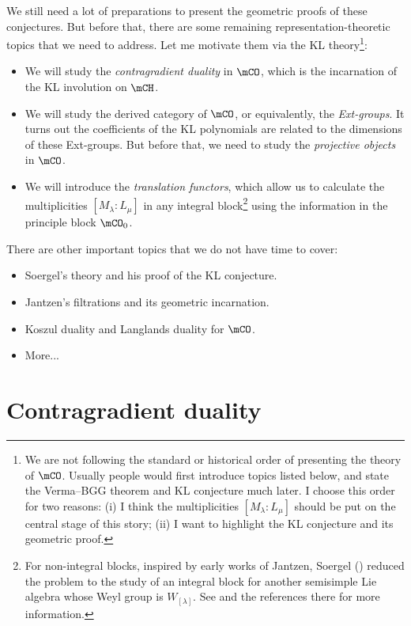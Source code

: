 	We still need a lot of preparations to present the geometric proofs of these conjectures. But before that, there are some remaining representation-theoretic topics that we need to address. Let me motivate them via the KL theory\footnote{We are not following the standard or historical order of presenting the theory of $\mCO$. Usually people would first introduce topics listed below, and state the Verma--BGG theorem and KL conjecture much later. I choose this order for two reasons: (i) I think the multiplicities $[M_\lambda:L_\mu]$ should be put on the central stage of this story; (ii) I want to highlight the KL conjecture and its geometric proof.}:
	\begin{itemize}
		\item 
			We will study the \emph{contragradient duality} in $\mCO$, which is the incarnation of the KL involution on $\mCH$.
		\item
			We will study the derived category of $\mCO$, or equivalently, the \emph{Ext-groups}. It turns out the coefficients of the KL polynomials are related to the dimensions of these Ext-groups. But before that, we need to study the \emph{projective objects} in $\mCO$.
		\item
			We will introduce the \emph{translation functors}, which allow us to calculate the multiplicities $[M_\lambda:L_\mu]$ in any integral block\footnote{For non-integral blocks, inspired by early works of Jantzen, Soergel (\!\!\cite{S}) reduced the problem to the study of an integral block for another semisimple Lie algebra whose Weyl group is $W_{[\lambda]}$. See \cite[Sect. 13.13]{H} and the references there for more information.} using the information in the principle block $\mCO_0$.
	\end{itemize}
	There are other important topics that we do not have time to cover:
	\begin{itemize}
		\item 
			Soergel's theory and his proof of the KL conjecture.
		\item
			Jantzen's filtrations and its geometric incarnation.
		\item
			Koszul duality and Langlands duality for $\mCO$.
		\item
			More...
	\end{itemize}

\section{Contragradient duality}

